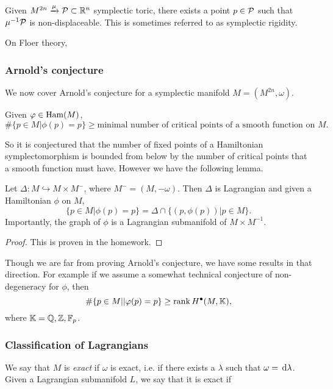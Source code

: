 \begin{thm}
	Given $M^{2n}\xrightarrow\mu\mathcal{P}\subset\mathbb{R}^n$ symplectic toric, there exists a point $p\in\mathcal{P}$ such that $\mu^{-1}\mathcal{P}$ is non-displaceable.
	This is sometimes referred to as symplectic rigidity.
\end{thm}

\begin{remark}
    On Floer theory,
\end{remark}

\subsubsection*{Arnold's conjecture}

We now cover Arnold's conjecture for a symplectic manifold $M=(M^{2n},\omega)$.

\begin{con}[Arnold]
	Given $\varphi\in\operatorname{Ham}(M)$,
	\[\#\{p\in M|\phi(p)=p\}\ge\text{minimal number of critical points of a smooth function on } M.\]
\end{con}

So it is conjectured that the number of fixed points of a Hamiltonian symplectomorphism is bounded from below by the number of critical points that a smooth function must have.
However we have the following lemma.

\begin{lem}
	Let $\Delta:M\hookrightarrow M\times M^-$, where $M^-=(M,-\omega)$.
	Then $\Delta$ is Lagrangian and given a Hamiltonian $\phi$ on $M$,
	\[\{p\in M|\phi(p)=p\}=\Delta\cap\{(p,\phi(p))|p\in M\}.\]
	Importantly, the graph of $\phi$ is a Lagrangian submanifold of $M\times M^{-1}$.
\end{lem}

\begin{proof}
	This is proven in the homework.
\end{proof}


Though we are far from proving Arnold's conjecture, we have some results in that direction.
For example if we assume a somewhat technical conjecture of non-degeneracy for $\phi$, then
\[\#\{p\in M||\varphi(p)=p\}\ge\operatorname{rank}H^\bullet(M,\mathbb{K}),\]
where $\mathbb{K}=\mathbb{Q},\mathbb{Z},\mathbb{F}_p$.

\subsubsection*{Classification of Lagrangians}
\begin{dfn}[Exactness]
	We say that $M$ is \emph{exact} if $\omega$ is exact, i.e. if there exists a $\lambda$ such that $\omega=\,\mathrm d\lambda$.
	Given a Lagrangian submanifold $L$, we say that it is exact if 
\end{dfn}

